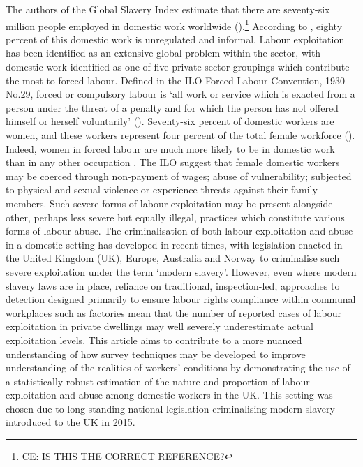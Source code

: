 \documentclass[
  12pt,
  letterpaper,
  DIV=11,
  numbers=noendperiod]{scrartcl}
\begin{document}
The authors of the Global Slavery Index estimate that there are
seventy-six million people employed in domestic work worldwide
(\textcite{international_labour_organization_global_2022}).\footnote{CE:
  IS THIS THE CORRECT REFERENCE?} According to
\textcite{bonnet_domestic_2022}, eighty percent of this domestic work is
unregulated and informal. Labour exploitation has been identified as an
extensive global problem within the sector, with domestic work
identified as one of five private sector groupings which contribute the
most to forced labour. Defined in the ILO Forced Labour Convention, 1930
No.29, forced or compulsory labour is `all work or service which is
exacted from a person under the threat of a penalty and for which the
person has not offered himself or herself voluntarily'
(\textcite{international_labour_organization_global_2022}). Seventy-six
percent of domestic workers are women, and these workers represent four
percent of the total female workforce
(\textcite{international_labour_organization_global_2022}). Indeed,
women in forced labour are much more likely to be in domestic work than
in any other occupation
\autocite{international_labour_organization_global_2022}. The ILO
suggest that female domestic workers may be coerced through non-payment
of wages; abuse of vulnerability; subjected to physical and sexual
violence or experience threats against their family members. Such severe
forms of labour exploitation may be present alongside other, perhaps
less severe but equally illegal, practices which constitute various
forms of labour abuse. The criminalisation of both labour exploitation
and abuse in a domestic setting has developed in recent times, with
legislation enacted in the United Kingdom (UK), Europe, Australia and
Norway to criminalise such severe exploitation under the term `modern
slavery'. However, even where modern slavery laws are in place, reliance
on traditional, inspection-led, approaches to detection designed
primarily to ensure labour rights compliance within communal workplaces
such as factories mean that the number of reported cases of labour
exploitation in private dwellings may well severely underestimate actual
exploitation levels. This article aims to contribute to a more nuanced
understanding of how survey techniques may be developed to improve
understanding of the realities of workers' conditions by demonstrating
the use of a statistically robust estimation of the nature and
proportion of labour exploitation and abuse among domestic workers in
the UK. This setting was chosen due to long-standing national
legislation criminalising modern slavery introduced to the UK in 2015.
\end{document}
